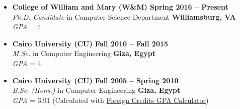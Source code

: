 \documentclass[10pt,a4]{article}
\begin{document}


\begin{itemize}

\item{\bf College of William and Mary (W\&M) \hfill {\bf Spring 2016 -- Present}} \\
{\it Ph.D. Candidate} in Computer Science Department \hfill {\bf Williamsburg, VA}\\
{\it GPA} = 4

\item{\bf Cairo University (CU) \hfill {\bf Fall 2010 -- Fall 2015}} \\
{\it M.Sc.} in Computer Engineering \hfill {\bf Giza, Egypt}\\
{\it GPA} = 4

\item{\bf Cairo University (CU) \hfill {\bf Fall 2005 -- Spring 2010}} \\
{\it B.Sc. (Hons.)} in Computer Engineering \hfill {\bf Giza, Egypt}\\
{\it GPA} = 3.91 (Calculated with \href{http://www.foreigncredits.com/Resources/GPA-Calculator/}{Foreign Credits GPA Calculator})

\end{itemize}
\end{document}
